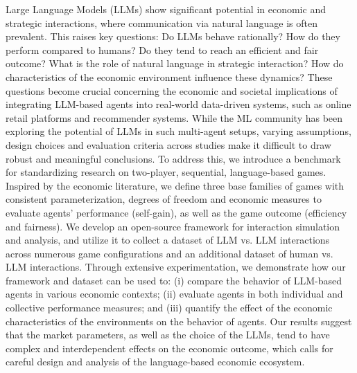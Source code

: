 Large Language Models (LLMs) show significant potential in economic and strategic interactions, where communication via natural language is often prevalent. This raises key questions: Do LLMs behave rationally?  How do they perform compared to humans? Do they tend to reach an efficient and fair outcome? What is the role of natural language in strategic interaction? How do characteristics of the economic environment influence these dynamics? These questions become crucial concerning the economic and societal implications of integrating LLM-based agents into real-world data-driven systems, such as online retail platforms and recommender systems.
While the ML community has been exploring the potential of LLMs in such multi-agent setups, varying assumptions, design choices and evaluation criteria across studies make it difficult to draw robust and meaningful conclusions. To address this, we introduce a benchmark for standardizing research on two-player, sequential, language-based games. Inspired by the economic literature, we define three base families of games with consistent parameterization, degrees of freedom and economic measures to evaluate agents' performance (self-gain), as well as the game outcome (efficiency and fairness). We develop an open-source framework for interaction simulation and analysis, and utilize it to collect a dataset of LLM vs. LLM interactions across numerous game configurations and an additional dataset of human vs. LLM interactions.
Through extensive experimentation, we demonstrate how our framework and dataset can be used to: (i) compare the behavior of LLM-based agents in various economic contexts; (ii) evaluate agents in both individual and collective performance measures; and (iii) quantify the effect of the economic characteristics of the environments on the behavior of agents. Our results suggest that the market parameters, as well as the choice of the LLMs, tend to have complex and interdependent effects on the economic outcome, which calls for careful design and analysis of the language-based economic ecosystem.